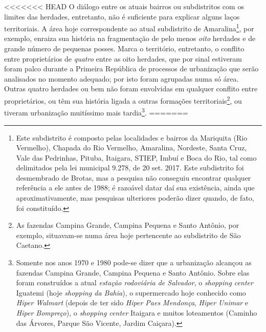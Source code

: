 <<<<<<< HEAD
O diálogo entre os atuais bairros ou subdistritos com os limites das herdades, entretanto, não é suficiente para explicar alguns laços territoriais. A área hoje correspondente ao atual subdistrito de Amaralina\footnote{Este subdistrito é composto pelas localidades e bairros da Mariquita (Rio Vermelho), Chapada do Rio Vermelho, Amaralina, Nordeste, Santa Cruz, Vale das Pedrinhas, Pituba, Itaigara, STIEP, Imbuí e Boca do Rio, tal como delimitados pela lei municipal 9.278, de 20 set. 2017. Este subdistrito foi desmembrado de Brotas, mas a pesquisa não conseguiu encontrar qualquer referência a ele antes de 1988; é razoável datar daí sua existência, ainda que aproximativamente, mas pesquisas ulteriores poderão dizer quando, de fato, foi constituído.}, por exemplo, enraiza sua história na fragmentação de pelo menos \textit{oito} herdades e de grande número de pequenas posses. Marca o território, entretanto, o conflito entre proprietários de \textit{quatro} entre as oito herdades, que por sinal estiveram foram palco durante a Primeira República de processos de urbanização que serão analisados no momento adequado; por isto foram agrupadas numa só área. Outras quatro herdades ou bem não foram envolvidas em qualquer conflito entre proprietários, ou têm sua história ligada a outras formações territoriais\footnote{As fazendas Campina Grande, Campina Pequena e Santo Antônio, por exemplo, situavam-se numa área hoje pertencente ao subdistrito de São Caetano.}, ou tiveram urbanização muitíssimo mais tardia\footnote{Somente nos anos 1970 e 1980 pode-se dizer que a urbanização alcançou as fazendas Campina Grande, Campina Pequena e Santo Antônio. Sobre elas foram construídos a atual \textit{estação rodoviária de Salvador}, o \textit{shopping center} Iguatemi (hoje \textit{shopping da Bahia}), o supermercado hoje conhecido como \textit{Hiper Walmart} (depois de ter sido \textit{Hiper Paes Mendonça}, \textit{Hiper Unimar} e \textit{Hiper Bompreço}), o \textit{shopping center} Itaigara e muitos loteamentos (Caminho das Árvores, Parque São Vicente, Jardim Caiçara).}.
=======
